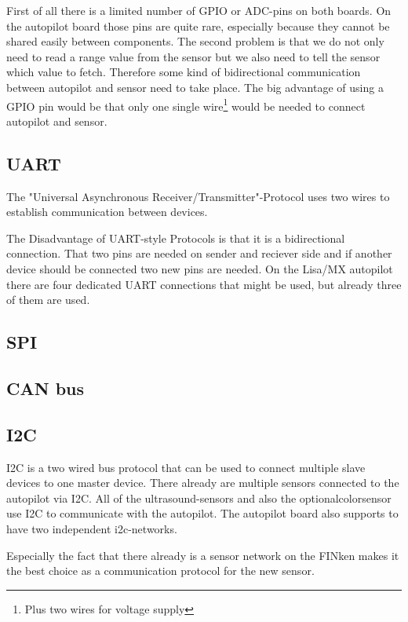 First of all there is a limited number of GPIO or ADC-pins on both boards.
On the autopilot board those pins are quite rare, especially because they cannot be shared easily between components.
The second problem is that we do not only need to read a range value from the sensor but we also need to tell the sensor which value to fetch.
Therefore some kind of bidirectional communication between autopilot and sensor need to take place.
The big advantage of using a GPIO pin would be that only one single wire\footnote{Plus two wires for voltage supply} would be needed to connect autopilot and sensor.

\subsection{UART}
The "Universal Asynchronous Receiver/Transmitter"-Protocol uses two wires to establish communication between devices.
\cite{wingen_automatic_2004}

The Disadvantage of UART-style Protocols is that it is a bidirectional connection.
That two pins are needed on sender and reciever side and if another device should be connected two new pins are needed.
On the Lisa/MX autopilot there are four dedicated UART connections that might be used, but already three of them are used.

\subsection{SPI}

\subsection{CAN bus}

\subsection{I2C}
I2C is a two wired bus protocol that can be used to connect multiple slave devices to one master device.
There already are multiple sensors connected to the autopilot via I2C.
All of the ultrasound-sensors and also the optionalcolorsensor use I2C to communicate with the autopilot.
The autopilot board also supports to have two independent i2c-networks.

Especially the fact that there already is a sensor network on the FINken makes it the best choice as a communication protocol for the new sensor.


